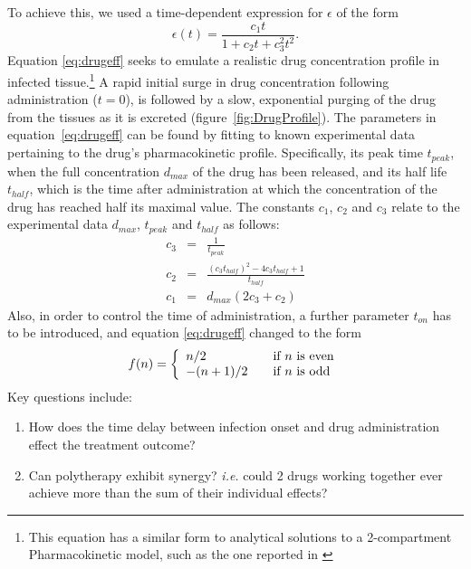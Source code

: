 \documentclass[a4paper, 12pt]{report}
\begin{document}
To achieve this, we used a time-dependent expression for $\epsilon$ of the form
\begin{equation}
\epsilon(t) = \frac{c_{1}t}{1 + c_{2}t+c_{3}^{2}t^{2}}. \label{eq:drugeff}
\end{equation}
Equation \eqref{eq:drugeff} seeks to emulate a realistic drug concentration profile in infected tissue.\footnote{This equation has a similar form to analytical solutions to a 2-compartment Pharmacokinetic model, such as the one reported in \cite{}}
A rapid initial surge in drug concentration following administration ($t = 0$), is followed by a slow, exponential purging of the drug from the tissues as it is excreted (figure~\ref{fig:DrugProfile}). The parameters in equation~\ref{eq:drugeff} can be found by fitting to known experimental data pertaining to the drug's pharmacokinetic profile.
Specifically, its peak time $t_{peak}$, when the full concentration $d_{max}$ of the drug has been released, and its half life $t_{half}$, which is the time after administration at which the concentration of the drug has reached half its maximal value. The constants $c_1$, $c_2$ and $c_3$ relate to the experimental data $d_{max}$, $t_{peak}$ and $t_{half}$ as follows:
\begin{eqnarray}
c_3 &=& \frac{1}{t_{peak}}\\
c_2 &=& \frac{(c_3 t_{half})^2 - 4 c_3 t_{half} + 1}{t_{half}}\\
c_1 &=& d_{max} (2 c_3 + c_2)
\end{eqnarray}
Also, in order to control the time of administration, a further parameter $t_{on}$ has to be introduced, and equation \eqref{eq:drugeff} changed to the form
\begin{equation}
f(n) = \left\{ 
   \begin{array}{l l}
     n/2 & \quad \text{if $n$ is even}\\
     -(n+1)/2 & \quad \text{if $n$ is odd}
   \end{array} \right.
\end{equation}
Key questions include:
\begin{enumerate}
\item How does the time delay between infection onset and drug administration effect the treatment outcome?
\item Can polytherapy exhibit synergy? \textit{i.e.} could 2 drugs working together ever achieve more than the sum of their individual effects?
\end{enumerate}
\end{document}
